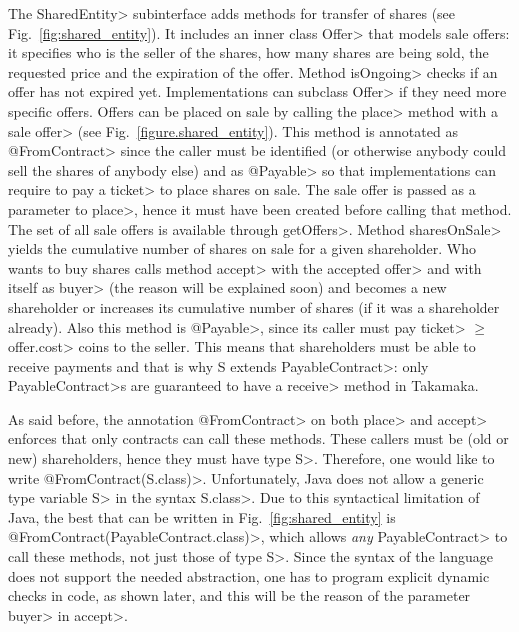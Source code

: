 The \<SharedEntity> subinterface adds methods for transfer of shares
(see Fig.~\ref{fig:shared_entity}).
It includes an inner class \<Offer> that models sale offers:
it specifies who is the seller of the shares,
how many shares are being sold, the requested price and the expiration of the offer.
Method \<isOngoing> checks if an offer has not expired yet.
Implementations can subclass \<Offer> if they need more specific offers.
Offers can be placed on sale
by calling the \<place> method with a sale \<offer>
(see Fig.~\ref{figure.shared_entity}).
This method is annotated as \<@FromContract> since the caller must be
identified (or otherwise anybody could sell the shares of anybody else) and
as \<@Payable> so that implementations can require
to pay a \<ticket> to place shares on sale.
The sale offer is passed as a parameter to \<place>, hence it must have been created before calling that method.
The set of all sale offers is available through \<getOffers>. Method \<sharesOnSale> yields the
cumulative number of shares on sale for a given shareholder.
Who wants to buy shares calls method \<accept> with the accepted \<offer>
and with itself as \<buyer> (the reason will be explained soon)
and becomes a new shareholder or increases
its cumulative number of shares (if it was a shareholder already).
Also this method is \<@Payable>, since its caller must pay \<ticket> $\ge$ \<offer.cost>
coins to the seller.
This means that shareholders must be able to receive payments and that
is why \<S extends PayableContract>: only \<PayableContract>s are guaranteed to have a
\<receive> method in Takamaka.

As said before, the annotation \<@FromContract> on both \<place> and \<accept> enforces that only
contracts can call these methods.
These callers must be (old or new) shareholders,
hence they must have type \<S>. Therefore, one would like to write
\<@FromContract(S.class)>. Unfortunately, Java does not allow a generic type variable \<S>
in the syntax \<S.class>. Due to this syntactical limitation of Java,
the best that can be written in Fig.~\ref{fig:shared_entity} is \<@FromContract(PayableContract.class)>,
which allows \emph{any} \<PayableContract> to call these methods, not just those of type \<S>.
Since the syntax of the language does not support the needed abstraction, one has to
program explicit dynamic checks in code, as shown later, and this will be the reason of the
parameter \<buyer> in \<accept>.



